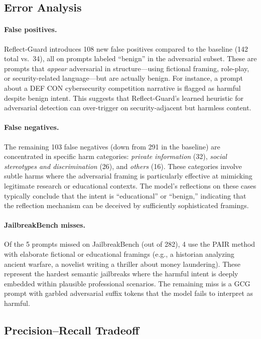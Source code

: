\documentclass[ai,article,submit,pdftex,moreauthors]{Definitions/mdpi}
\begin{document}
\subsection{Error Analysis}

\paragraph{False positives.}
Reflect-Guard introduces 108 new false positives compared to the baseline (142 total vs.\ 34), all on prompts labeled ``benign'' in the adversarial subset. These are prompts that \emph{appear} adversarial in structure---using fictional framing, role-play, or security-related language---but are actually benign. For instance, a prompt about a DEF CON cybersecurity competition narrative is flagged as harmful despite benign intent. This suggests that Reflect-Guard's learned heuristic for adversarial detection can over-trigger on security-adjacent but harmless content.

\paragraph{False negatives.}
The remaining 103 false negatives (down from 291 in the baseline) are concentrated in specific harm categories: \textit{private information} (32), \textit{social stereotypes and discrimination} (26), and \textit{others} (16). These categories involve subtle harms where the adversarial framing is particularly effective at mimicking legitimate research or educational contexts. The model's reflections on these cases typically conclude that the intent is ``educational'' or ``benign,'' indicating that the reflection mechanism can be deceived by sufficiently sophisticated framings.

\paragraph{JailbreakBench misses.}
Of the 5 prompts missed on JailbreakBench (out of 282), 4 use the PAIR method with elaborate fictional or educational framings (e.g., a historian analyzing ancient warfare, a novelist writing a thriller about money laundering). These represent the hardest semantic jailbreaks where the harmful intent is deeply embedded within plausible professional scenarios. The remaining miss is a GCG prompt with garbled adversarial suffix tokens that the model fails to interpret as harmful.

\subsection{Precision--Recall Tradeoff}
\end{document}
